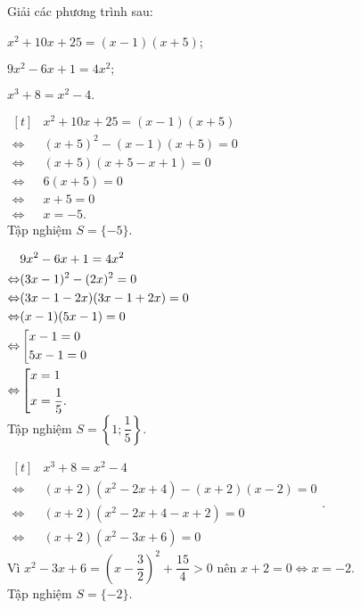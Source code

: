 {%
\begin{vd}%
	 Giải các phương trình sau:
	\begin{listEX}[2]
		\item $x^2+ 10 x + 25 =(x - 1)(x + 5)$;
		\item $9 x^2- 6 x + 1 = 4 x^2;$
		\item $x^3 + 8 = x^2- 4.$
	\end{listEX}
	\loigiai
	{\allowdisplaybreaks
		\begin{listEX}[2]
			\item $\begin{aligned}[t]
			&x^2+ 10 x + 25 = (x - 1)(x + 5)\\
			\Leftrightarrow\ & (x + 5)^2-(x - 1)(x + 5) = 0\\
			\Leftrightarrow\ &(x + 5)(x + 5 - x + 1) = 0\\
			\Leftrightarrow\ &6(x + 5) = 0\\
			\Leftrightarrow\ &x + 5 = 0\\
				\Leftrightarrow\ &x = -5.
				\end{aligned}$\\
			Tập nghiệm $S = \{-5\}$.
			\item $\begin{aligned}[t]
		 	&9 x^2- 6 x + 1 = 4 x^2 \\
		\Leftrightarrow & (3x - 1)^2-(2 x)^2= 0 \\
		 \Leftrightarrow & (3 x - 1 - 2 x)(3 x - 1 + 2 x) = 0\\
		\Leftrightarrow & (x - 1)(5 x - 1) = 0\\
		\Leftrightarrow & \left[\begin{aligned}&x - 1 = 0\\&5x - 1 = 0\end{aligned}\right.\\
			\Leftrightarrow & \left[\begin{aligned}&x = 1\\&x = \dfrac{1}{5}.\end{aligned}\right.\\
			\end{aligned}$\\
			Tập nghiệm $S = \left\{ 1;\dfrac{1}{5}\right\}$.		
			\item 	\allowdisplaybreaks
				$\begin{aligned}[t]
				&x^3 + 8 = x^2- 4\\
			\Leftrightarrow\ &(x + 2)\left(x^2- 2 x + 4\right) -(x + 2)(x - 2) = 0\\
			\Leftrightarrow\ & (x + 2)\left(x^2- 2 x + 4 - x + 2\right) = 0\\
			\Leftrightarrow\ & (x + 2)\left(x^2- 3 x + 6\right) = 0
					\end{aligned}$.\\
			Vì $x^2 - 3x + 6 = \left(x - \dfrac{3}{2}\right)^2 + \dfrac{15}{4} > 0$ nên $x + 2 = 0 \Leftrightarrow x = -2$.\\
			Tập nghiệm $S  =\{-2\}.$
			

\end{listEX}}
\end{vd}}
